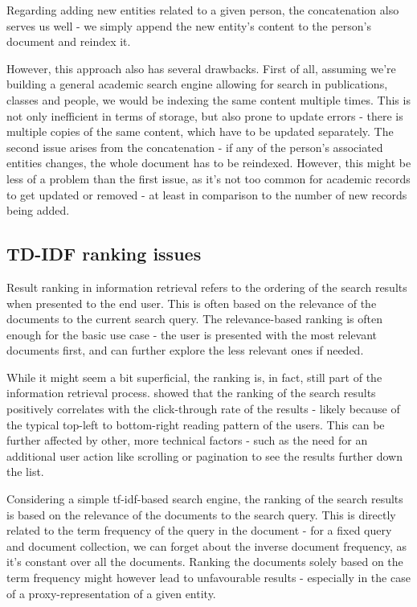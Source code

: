 Regarding adding new entities related to a given person, the concatenation also serves us well - we simply append the new entity's content to the person's document and reindex it.

However, this approach also has several drawbacks. First of all, assuming we're building a general academic search engine allowing for search in publications, classes and people, we would be indexing the same content multiple times.
This is not only inefficient in terms of storage, but also prone to update errors - there is multiple copies of the same content, which have to be updated separately.
The second issue arises from the concatenation - if any of the person's associated entities changes, the whole document has to be reindexed.
However, this might be less of a problem than the first issue, as it's not too common for academic records to get updated or removed - at least in comparison to the number of new records being added.

\subsection{TD-IDF ranking issues} \label{search-ranking-issues}

Result ranking in information retrieval refers to the ordering of the search results when presented to the end user. This is often based on the relevance of the documents to the current search query.
The relevance-based ranking is often enough for the basic use case - the user is presented with the most relevant documents first, and can further explore the less relevant ones if needed.

While it might seem a bit superficial, the ranking is, in fact, still part of the information retrieval process. 
\cite{ranking-user-choice} showed that
the ranking of the search results positively correlates with the click-through rate of the results 
- likely because of the typical top-left to bottom-right reading pattern of the users.
This can be further affected by other, more technical factors - such as the need for an additional user action like scrolling or pagination to see the results further down the list.


Considering a simple tf-idf-based search engine, the ranking of the search results is based on the relevance of the documents to the search query.
This is directly related to the term frequency of the query in the document - for a fixed query and document collection, we can forget about the inverse document frequency, as it's constant over all the documents.
Ranking the documents solely based on the term frequency might however lead to unfavourable results - especially in the case of a proxy-representation of a given entity.


